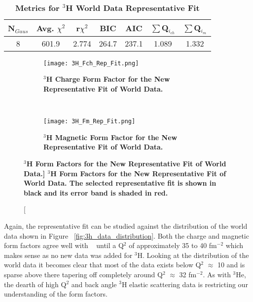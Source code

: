 \begin{table}[!h]
\centering
\begin{tabular}{|c c c c c c c|}
\hline
\textbf{N$_{Gaus}$} & \textbf{Avg. $\chi^2$} & \textbf{r$\chi^2$} & \textbf{BIC} & \textbf{AIC} & \textbf{$\sum$Q$_{i_{ch}}$} & \textbf{$\sum$Q$_{i_{m}}$}\\
\hline
8 & 601.9 & 2.774 & 264.7 & 237.1 & 1.089 & 1.332\\
\hline
\end{tabular}
\caption{\bf{Metrics for $^3$H World Data Representative Fit}}
\label{tab:3h_rep_fit_stats}
\end{table}

\begin{figure}[!ht]
\begin{subfigure}{1.\textwidth}
  \centering
  \texttt{[image: 3H\_Fch\_Rep\_Fit.png]}
  \caption{\bf{$^3$H Charge Form Factor for the New Representative Fit of World Data.}}
  \label{fig:3h_fch_rep_fit}
\end{subfigure}\\
\begin{subfigure}{1.\textwidth}
  \centering
  \texttt{[image: 3H\_Fm\_Rep\_Fit.png]}
  \caption{\bf{$^3$H Magnetic Form Factor for the New Representative Fit of World Data.}}
  \label{fig:3h_fm_rep_fit}
\end{subfigure}
\caption[\bf{$^3$H Form Factors for the New Representative Fit of World Data.}] {
{\bf{$^3$H Form Factors for the New Representative Fit of World Data.}} The selected representative fit is shown in black and its error band is shaded in red.}
\label{fig:3h_rep_fit}
\end{figure}

Again, the representative fit can be studied against the distribution of the world data shown in Figure ~\ref{fig:3h_data_distribution}. Both the charge and magnetic form factors agree well with  ~\cite{Article:Amroun} until a Q$^2$ of approximately 35 to 40 fm$^{-2}$ which makes sense as no new data was added for $^3$H. Looking at the distribution of the world data it becomes clear that most of the data exists below Q$^2$ $\approx$ 10 and is sparse above there tapering off completely around Q$^2$ $\approx$ 32 fm$^{-2}$. As with $^3$He, the dearth of high Q$^2$ and back angle $^3$H elastic scattering data is restricting our understanding of the form factors.

